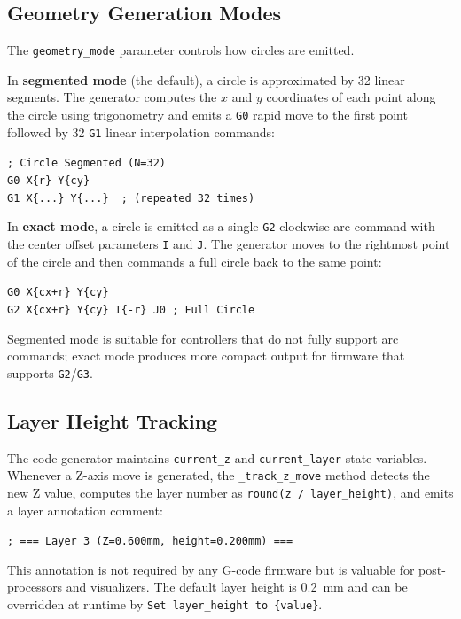 \subsection*{Geometry Generation Modes}

The \texttt{geometry\_mode} parameter controls how circles are emitted.

In \textbf{segmented mode} (the default), a circle is approximated by 32 linear segments. The generator computes the $x$ and $y$ coordinates of each point along the circle using trigonometry and emits a \texttt{G0} rapid move to the first point followed by 32 \texttt{G1} linear interpolation commands:

\begin{center}
\verb|; Circle Segmented (N=32)|\\
\verb|G0 X{r} Y{cy}|\\
\verb|G1 X{...} Y{...}  ; (repeated 32 times)|
\end{center}

In \textbf{exact mode}, a circle is emitted as a single \texttt{G2} clockwise arc command with the center offset parameters \texttt{I} and \texttt{J}. The generator moves to the rightmost point of the circle and then commands a full circle back to the same point:

\begin{center}
\verb|G0 X{cx+r} Y{cy}|\\
\verb|G2 X{cx+r} Y{cy} I{-r} J0 ; Full Circle|
\end{center}

Segmented mode is suitable for controllers that do not fully support arc commands; exact mode produces more compact output for firmware that supports \texttt{G2}/\texttt{G3}.

\subsection*{Layer Height Tracking}

The code generator maintains \texttt{current\_z} and \texttt{current\_layer} state variables. Whenever a Z-axis move is generated, the \texttt{\_track\_z\_move} method detects the new Z value, computes the layer number as \texttt{round(z / layer\_height)}, and emits a layer annotation comment:

\begin{center}
\verb|; === Layer 3 (Z=0.600mm, height=0.200mm) ===|
\end{center}

This annotation is not required by any G-code firmware but is valuable for post-processors and visualizers. The default layer height is 0.2~mm and can be overridden at runtime by \texttt{Set layer\_height to \{value\}}.

